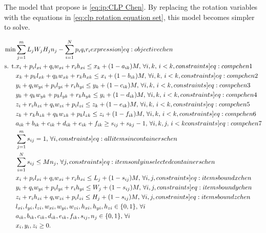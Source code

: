 The model that \textcite{CHEN1995} propose is \cref{eq:ip:CLP Chen}. By replacing the rotation variables with the equations in \cref{eq:clp rotation equation set}, this model becomes simpler to solve.

\begin{subequations}
    \label{eq:ip:CLP Chen}
    \begin{align}
        \min &\sum_{j=1}^{m}L_jW_jH_jn_j - \sum_{i=1}^{N}p_iq_ir_i \label[expression]{eq:objective chen}\\
        \text{s. t.} &x_i + p_i l_{xi} + q_i w_{xi} + r_i h_{xi} \leq x_k + (1 - a_{ik}) M, \, \forall i, k, \, i < k, \label[constraints]{eq:comp chen 1}\\
        &x_k + p_k l_{xk} + q_k w_{xk} + r_k h_{xk} \leq x_i + (1 - b_{ik}) M, \, \forall i, k, \, i < k, \label[constraints]{eq:comp chen 2}\\
        &y_i + q_i w_{yi} + p_i l_{yi} + r_i h_{yi} \leq y_k + (1 - c_{ik}) M, \, \forall i, k, \, i < k, \label[constraints]{eq:comp chen 3}\\
        &y_k + q_k w_{yk} + p_k l_{yk} + r_k h_{yk} \leq y_i + (1 - d_{ik}) M, \, \forall i, k, \, i < k, \label[constraints]{eq:comp chen 4}\\
        &z_i + r_i h_{zi} + q_i w_{zi} + p_i l_{zi} \leq z_k + (1 - e_{ik}) M, \, \forall i, k, \, i < k, \label[constraints]{eq:comp chen 5}\\
        &z_k + r_k h_{zk} + q_k w_{zk} + p_k l_{zk} \leq z_i + (1 - f_{ik}) M, \, \forall i, k, \, i < k, \label[constraints]{eq:comp chen 6}\\
        &a_{ik} + b_{ik} + c_{ik} + d_{ik} + e_{ik} + f_{ik} \geq s_{ij} + s_{kj} - 1, \, \forall i, k, j, \, i < k \label[constraints]{eq:comp chen 7}\\
        &\sum_{j=1}^{m} s_{ij} = 1, \, \forall i, \label[constraints]{eq:all items in containers chen}\\
        &\sum_{i=1}^{N} s_{ij} \leq M n_j, \, \forall j, \label[constraints]{eq:items only in selected containers chen}\\
        &x_i + p_i l_{xi} + q_i w_{xi} + r_i h_{xi} \leq L_j + (1 - s_{ij}) M, \, \forall i, j, \label[constraints]{eq:items bound x chen}\\
        &y_i + q_i w_{yi} + p_i l_{yi} + r_i h_{yi} \leq W_j + (1 - s_{ij}) M, \, \forall i, j, \label[constraints]{eq:items bound y chen}\\
        &z_i + r_i h_{zi} + q_i w_{zi} + p_i l_{zi} \leq H_j + (1 - s_{ij}) M, \, \forall i, j, \label[constraints]{eq:items bound z chen}\\
        &l_{xi}, l_{yi}, l_{zi}, w_{xi}, w_{yi}, w_{zi}, h_{xi}, h_{yi}, h_{zi} \in \{0,1\}, \, \forall i\\
        &a_{ik}, b_{ik}, c_{ik}, d_{ik}, e_{ik}, f_{ik}, s_{ij}, n_j \in \{0,1\}, \, \forall i\\
        &x_i, y_i, z_i \geq 0.
    \end{align}
\end{subequations}

